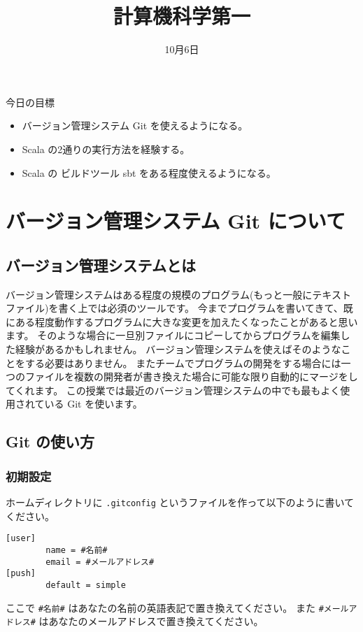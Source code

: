 \documentclass[a4paper]{article}
\title{計算機科学第一}
\date{10月6日}
\begin{document}
\maketitle

今日の目標
\begin{itemize}
\item バージョン管理システム Git を使えるようになる。
\item Scala の2通りの実行方法を経験する。
\item Scala の ビルドツール sbt をある程度使えるようになる。
\end{itemize}

\section{バージョン管理システム Git について}
\subsection{バージョン管理システムとは}
バージョン管理システムはある程度の規模のプログラム(もっと一般にテキストファイル)を書く上では必須のツールです。
今までプログラムを書いてきて、既にある程度動作するプログラムに大きな変更を加えたくなったことがあると思います。
そのような場合に一旦別ファイルにコピーしてからプログラムを編集した経験があるかもしれません。
バージョン管理システムを使えばそのようなことをする必要はありません。
またチームでプログラムの開発をする場合には一つのファイルを複数の開発者が書き換えた場合に可能な限り自動的にマージをしてくれます。
この授業では最近のバージョン管理システムの中でも最もよく使用されている Git を使います。

\subsection{Git の使い方}
\subsubsection{初期設定}
ホームディレクトリに \texttt{.gitconfig} というファイルを作って以下のように書いてください。
\begin{verbatim}
[user]
        name = #名前#
        email = #メールアドレス#
[push]
        default = simple
\end{verbatim}
ここで \texttt{\#名前\#} はあなたの名前の英語表記で置き換えてください。
また \texttt{\#メールアドレス\#} はあなたのメールアドレスで置き換えてください。
\end{document}
